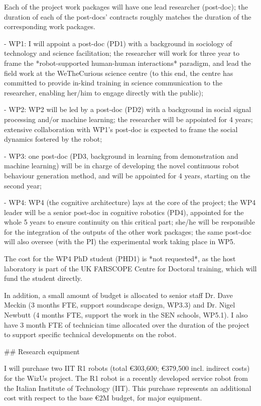 \documentclass[11pt,a4paper]{report}
\begin{document}
Each of the project work packages will have one lead researcher (post-doc); the duration of each
 of the post-docs' contracts roughly matches the duration of the corresponding work packages.

-   WP1: I will appoint a post-doc (PD1) with a background in sociology of technology and science facilitation;
    the researcher will work for three year to frame the *robot-supported human-human interactions*
    paradigm, and lead the field work at the WeTheCurious science centre (to
    this end, the centre has committed to provide in-kind training in science
    communication to the researcher, enabling her/him to engage directly with
    the public);

-   WP2: WP2 will be led by a post-doc (PD2) with a background in social signal processing and/or machine 
    learning; the researcher will be appointed for 4 years; extensive collaboration with WP1's post-doc
    is expected to frame the social dynamics fostered by the robot;

-   WP3: one post-doc (PD3, background in learning from demonstration and machine learning) will be in charge 
    of developing the novel continuous robot behaviour generation method, and will be appointed for 4 years, 
    starting on the second year;

-   WP4: WP4 (the cognitive architecture) lays at the core of the project; the WP4 leader will be a senior 
    post-doc in cognitive robotics (PD4), appointed for the whole 5 years to ensure continuity on this critical part; 
    she/he will be responsible for the integration of the outputs of the other work packages; the same post-doc will
    also oversee (with the PI) the experimental work taking place in WP5.

The cost for the WP4 PhD student (PHD1) is *not requested*, as the host
laboratory is part of the UK FARSCOPE Centre for Doctoral training, which will
fund the student directly.

In addition, a small amount of budget is allocated to senior staff Dr. Dave
Meckin (3 months FTE, support soundscape design, WP3.3) and Dr. Nigel Newbutt (4
months FTE, support the work in the SEN schools, WP5.1). I also have 3 month FTE
of technician time allocated over the duration of the project to support
specific technical developments on the robot.

## Research equipment

I will purchase two IIT R1 robots (total €303,600; €379,500 incl. indirect
costs) for the WizUs project. The R1 robot is a recently developed service robot
from the Italian Institute of Technology (IIT). This purchase represents an
additional cost with respect to the base €2M budget, for major equipment.
\end{document}
